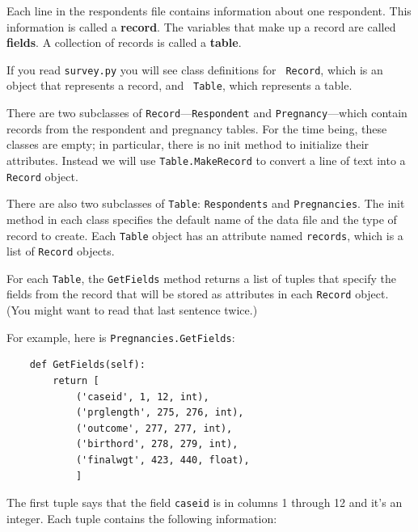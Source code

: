 \documentclass[12pt]{book}
\begin{document}
Each line in the respondents file contains information about one
respondent.  This information is called a {\bf record}.  The
variables that make up a record are called {\bf fields}.  A
collection of records is called a {\bf table}.

If you read {\tt survey.py} you will see class definitions for {\tt
  Record}, which is an object that represents a record, and {\tt
  Table}, which represents a table.

There are two subclasses of
{\tt Record}---{\tt Respondent} and {\tt Pregnancy}---which
contain records from the respondent and pregnancy tables.
For the time being, these classes are empty; in particular, there
is no init method to initialize their attributes.  Instead
we will use {\tt Table.MakeRecord} to convert a line of text into
a {\tt Record} object.

There are also two subclasses of {\tt Table}: {\tt Respondents}
and {\tt Pregnancies}.  The init method in each class
specifies the default name of the data file and the type of
record to create.  Each {\tt Table} object has an attribute
named {\tt records}, which is a list of {\tt Record} objects.

For each {\tt Table}, the {\tt GetFields} method returns
a list of tuples that specify the fields from the record that
will be stored as attributes in each {\tt Record} object.  (You
might want to read that last sentence twice.)

For example, here is {\tt Pregnancies.GetFields}:
%
\begin{verbatim}
    def GetFields(self):
        return [
            ('caseid', 1, 12, int),
            ('prglength', 275, 276, int),
            ('outcome', 277, 277, int),
            ('birthord', 278, 279, int),
            ('finalwgt', 423, 440, float),
            ]
\end{verbatim}

The first tuple says that the field {\tt caseid} is in columns
1 through 12 and it's an integer.  Each tuple contains the following
information:
\end{document}
